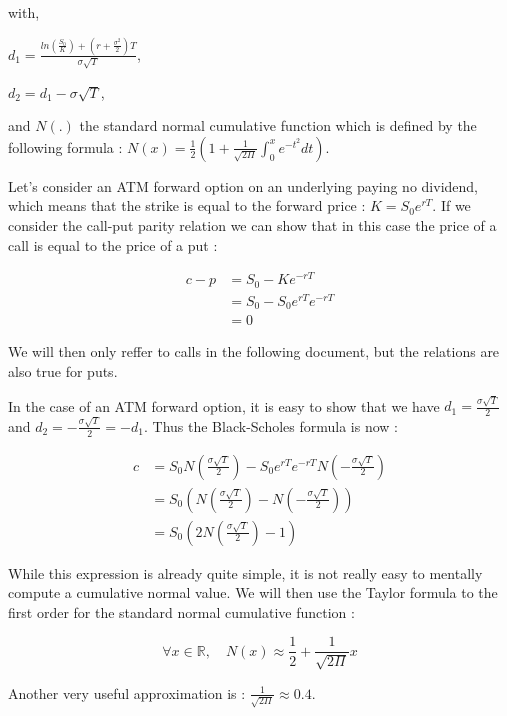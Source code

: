 \documentclass[hidelinks]{article}
\newenvironment{nalign}{
    \begin{equation}
    \begin{aligned}
}{
    \end{aligned}
    \end{equation}
    \ignorespacesafterend
}
\begin{document}
	with, 
	
	$d_1 = \frac{ln\left(\frac{S_0}{K}\right) + (r + \frac{\sigma^2}{2})T}{\sigma\sqrt{T}}$,
	
	$d_2 = d_1 - \sigma\sqrt{T}$,
	
	and $N(.)$ the standard normal cumulative function which is defined by the following formula : $N(x) = \frac{1}{2}\left(1+ \frac{1}{\sqrt{2\Pi}} \int_0^x e^{-t^2}dt \right)$.
	\newline
	
	
	Let's consider an ATM forward option on an underlying paying no dividend, which means that the strike is equal to the forward price : $K=S_0 e^{rT}$. If we consider the call-put parity relation we can show that in this case the price of a call is equal to the price of a put :
	
	\begin{nalign}
	c - p &= S_0 - Ke^{-rT} \\ 
	&= S_0 - S_0 e^{rT} e^{-rT} \\
	 & = 0
	\end{nalign}
	
	We will then only reffer to calls in the following document, but the relations are also true for puts. 
	\newline
	
	In the case of an ATM forward option, it is easy to show that we have $d_1=\frac{\sigma \sqrt{T}}{2}$ and $d_2=-\frac{\sigma \sqrt{T}}{2}=-d_1$. Thus the Black-Scholes formula is now :
	
	\begin{nalign}
		c &= S_0 N\left(\frac{\sigma \sqrt{T}}{2}\right) - S_0e^{rT}e^{-rT}N\left(-\frac{\sigma \sqrt{T}}{2}\right) \\
		&= S_0 \left(N\left(\frac{\sigma \sqrt{T}}{2}\right) -  N\left(-\frac{\sigma \sqrt{T}}{2}\right)\right)\\
		&= S_0 \left(2 N\left(\frac{\sigma \sqrt{T}}{2}\right) -1\right)
	\end{nalign} 
	
	\newpage
	While this expression is already quite simple, it is not really easy to mentally compute a cumulative normal value. We will then use the Taylor formula to the first order for the standard normal cumulative function :
	
	$$\forall x \in \mathbb{R}, \quad N(x) \approx \frac{1}{2} + \frac{1}{\sqrt{2 \Pi}}x$$
	
	Another very useful approximation is : $\frac{1}{\sqrt{2\Pi}} \approx 0.4$. 
	\newline
	
\end{document}
